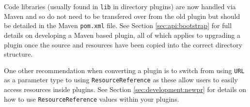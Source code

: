 Code libraries (usually found in \verb!lib! in directory plugins) are now handled via Maven
and so do not need to be transfered over from the old plugin but should be detailed in
the Maven \verb!pom.xml! file. See Section \ref{sec:api:bootstrap} for full details
on developing a Maven based plugin, all of which applies to upgrading a plugin once
the source and resources have been copied into the correct directory structure.

One other recommendation when converting a plugin is to switch from using \verb!URL!
as a parameter type to using \verb!ResourceReference! as these allow users to easily
access resources inside plugins. See Section \ref{sec:development:newpr} for details
on how to use \verb!ResourceReference! values within your plugins.
